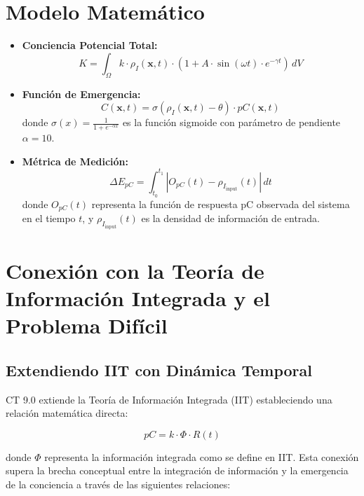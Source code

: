 \documentclass[12pt]{article}
\begin{document}
\section{Modelo Matemático}
\begin{itemize}
    \item \textbf{Conciencia Potencial Total:} 
    \begin{equation}
    K = \int_{\Omega} k \cdot \rho_I(\mathbf{x}, t) \cdot \left(1 + A \cdot \sin(\omega t) \cdot e^{-\gamma t}\right) \, dV
    \end{equation}
    
    \item \textbf{Función de Emergencia:} 
    \begin{equation}
    C(\mathbf{x}, t) = \sigma(\rho_I(\mathbf{x}, t) - \theta) \cdot pC(\mathbf{x}, t)
    \end{equation}
    donde $\sigma(x) = \frac{1}{1 + e^{-\alpha x}}$ es la función sigmoide con parámetro de pendiente $\alpha = 10$.
    
    \item \textbf{Métrica de Medición:} 
    \begin{equation}
    \Delta E_{pC} = \int_{t_0}^{t_1} |O_{pC}(t) - \rho_{I_{\text{input}}}(t)| \, dt
    \end{equation}
    donde $O_{pC}(t)$ representa la función de respuesta pC observada del sistema en el tiempo $t$, y $\rho_{I_{\text{input}}}(t)$ es la densidad de información de entrada.
\end{itemize}

\section{Conexión con la Teoría de Información Integrada y el Problema Difícil}

\subsection{Extendiendo IIT con Dinámica Temporal}
CT 9.0 extiende la Teoría de Información Integrada (IIT) \cite{tononi2008,tononi2016} estableciendo una relación matemática directa:

\begin{equation}
pC = k \cdot \Phi \cdot R(t)
\end{equation}

donde $\Phi$ representa la información integrada como se define en IIT. Esta conexión supera la brecha conceptual entre la integración de información y la emergencia de la conciencia a través de las siguientes relaciones:
\end{document}
